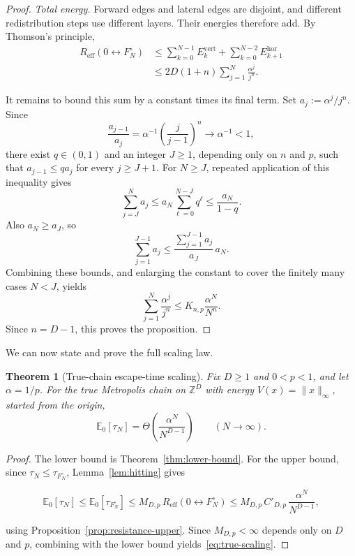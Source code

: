 \documentclass[conference]{IEEEtran}
\newtheorem{theorem}{Theorem}
\newcommand{\E}{\mathbb{E}}
\newcommand{\Z}{\mathbb{Z}}
\newcommand{\norm}[1]{\lVert #1\rVert}
\begin{document}
\begin{proof}
\emph{Total energy.}
Forward edges and lateral edges are disjoint, and different
redistribution steps use different layers. Their energies
therefore add. By Thomson's principle,
\[
\begin{aligned}
R_{\mathrm{eff}}(0 \leftrightarrow F_N^\circ)
&\le \sum_{k=0}^{N-1}E_k^{\mathrm{vert}}
   +\sum_{k=0}^{N-2}E_{k+1}^{\mathrm{hor}}\\
&\le 2D(1+n)\sum_{j=1}^{N}\frac{\alpha^j}{j^n}.
\end{aligned}
\]

It remains to bound this sum by a constant times its final term.
Set $a_j:=\alpha^j/j^n$. Since
\[
\frac{a_{j-1}}{a_j}
=\alpha^{-1}\left(\frac{j}{j-1}\right)^n
\longrightarrow \alpha^{-1}<1,
\]
there exist $q\in(0,1)$ and an integer $J\ge1$,
depending only on $n$ and $p$, such that
$a_{j-1}\le q a_j$ for every $j\ge J+1$.
For $N\ge J$, repeated application of this inequality gives
\[
\sum_{j=J}^{N}a_j
\le a_N\sum_{\ell=0}^{N-J}q^\ell
\le \frac{a_N}{1-q}.
\]
Also $a_N\ge a_J$, so
\[
\sum_{j=1}^{J-1}a_j
\le \frac{\sum_{j=1}^{J-1}a_j}{a_J}\,a_N.
\]
Combining these bounds, and enlarging the constant to cover
the finitely many cases $N<J$, yields
\[
\sum_{j=1}^{N}\frac{\alpha^j}{j^n}
\le K_{n,p}\frac{\alpha^N}{N^n}.
\]
Since $n=D-1$, this proves the proposition.
\end{proof}


We can now state and prove the full scaling law.

\begin{theorem}[True-chain escape-time scaling]
\label{thm:true-scaling}
Fix $D \ge 1$ and $0<p<1$, and let $\alpha = 1/p$.
For the true Metropolis chain on $\Z^D$ with energy
$V(x) = \norm{x}_\infty$, started from the origin,
\begin{equation}
\label{eq:true-scaling}
\E_0[\tau_N] = \Theta\!\left(\frac{\alpha^N}{N^{D-1}}\right)
\qquad (N \to \infty).
\end{equation}
\end{theorem}

\begin{proof}
The lower bound is Theorem~\ref{thm:lower-bound}.
For the upper bound, since $\tau_N \le \tau_{F_N^\circ}$,
Lemma~\ref{lem:hitting} gives
{\small
\[
\E_0[\tau_N] \le \E_0[\tau_{F_N^\circ}]
\le M_{D,p}\,R_{\mathrm{eff}}(0 \leftrightarrow F_N^\circ)
\le M_{D,p}\,C'_{D,p}\,\frac{\alpha^N}{N^{D-1}},
\]
\par}
using Proposition~\ref{prop:resistance-upper}.
Since $M_{D,p} < \infty$ depends only on $D$ and $p$, combining
with the lower bound yields~\eqref{eq:true-scaling}.
\end{proof}
\end{document}
